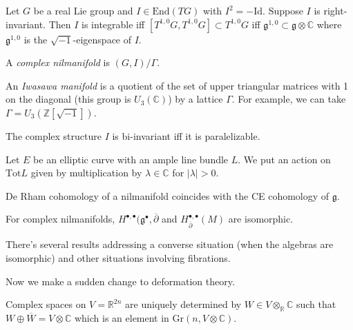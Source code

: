 \begin{theorem}[]
\label{theorem-}

\end{theorem}

\noindent
Let $G$ be a real Lie group
and $I \in \text{End}(TG)$ with
$I^2=-\text{Id}$.
Suppose $I$ is right-invariant.
Then $I$ is integrable iff
$[T^{1,0}G,T^{1,0}G]\subset T^{1,0}G$
iff
$\mathfrak{g}^{1,0}\subset\mathfrak{g}
\otimes\mathbb{C}$
where $\mathfrak{g}^{1,0}$ is the
$\sqrt{-1}$-eigenspace of $I$.

A {\it complex nilmanifold} is
$(G,I)/\Gamma$.

\begin{example}
\label{example-iwasawa-manifold}
An {\it Iwasawa manifold} is a quotient of
the set
of upper triangular matrices with 1 on the
diagonal
(this group is $U_3(\mathbb{C})$) by a
lattice $\Gamma$.
For example, we can take
$\Gamma=U_3(\mathbb{Z}[\sqrt{-1}])$.
\end{example}

\noindent
The complex structure $I$ is bi-invariant iff
it is paralelizable.

\medskip\noindent
Let $E$ be an elliptic curve with an ample
line bundle $L$.
We put an action on $\text{Tot}L$ given by
multiplication by
$\lambda \in \mathbb{C}$ for $|\lambda|>0$.

\begin{theorem}
\label{theorem-de-rham-cheva-eilen}
De Rham cohomology of a nilmanifold coincides
with the
CE cohomology of $\mathfrak{g}$.
\end{theorem}

\begin{theorem}
\label{theorem-console-fino}
For complex nilmanifolds,
$H^{\bullet,\bullet}(\mathfrak{g}^\bullet,
\overline{\partial}$
and
$H^{\bullet,\bullet}_{\overline{\partial}}(M)
$
are isomorphic.
\end{theorem}

\noindent
There's several results addressing a converse
situation
(when the algebras are isomorphic) and other
situations
involving fibrations.

\medskip\noindent
Now we make a sudden change to deformation
theory.

\begin{lemma}
\label{lemma-duplicate-2}
Complex spaces on $V=\mathbb{R}^{2n}$ are
uniquely determined
by $W \in V \otimes_{\mathbb{R}}\mathbb{C}$
such that $W \oplus \overline{ W}=V \otimes
\mathbb{C}$
which is an element in $\text{Gr}(n, V
\otimes \mathbb{C})$.
\end{lemma}

